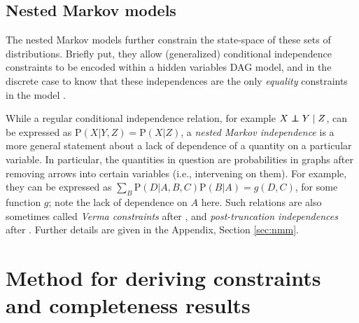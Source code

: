 \documentclass[12pt]{article}
\newcommand\indep{\protect\mathpalette{\protect\independenT}{\perp}}
\def\independenT#1#2{\mathrel{\rlap{$#1#2$}\mkern2mu{#1#2}}}
\def\Pr{{\mathrm{P}}}
\DeclareMathOperator{\Anobs}{Anobs}
\DeclareMathOperator{\Paobs}{Paobs}
\newcommand{\bW}{\boldsymbol{W}}
\DeclareMathOperator{\Do}{do}
\begin{document}



\subsection{Nested Markov models}

The nested Markov models \citep{richardson2023nested} further constrain the state-space of these sets of distributions. Briefly put, they allow (generalized) conditional independence constraints to be encoded within a hidden variables DAG model, and in the discrete case to know that these independences are the only \emph{equality} constraints in the model \citep{evans2018margins}. 


While a regular conditional independence relation, for example $X \indep Y \mid Z$, can be expressed as $\Pr(X | Y, Z) = \Pr(X | Z)$, a \emph{nested Markov independence} is a more general statement about a lack of dependence of a quantity on a particular variable. In particular, the quantities in question are probabilities in graphs after removing arrows into certain variables (i.e., intervening on them). For example, they can be expressed as $\sum_B \Pr(D | A, B, C)\Pr(B | A) = g(D, C)$, for some function $g$; note the lack of dependence on $A$ here. Such relations are also sometimes called \emph{Verma constraints} after \citet{verma2022equivalence}, and \emph{post-truncation independences} after \citet{shpitser2012parameter}.
Further details are given in the Appendix, Section \ref{sec:nmm}.



\section{Method for deriving constraints and completeness results}
\end{document}
